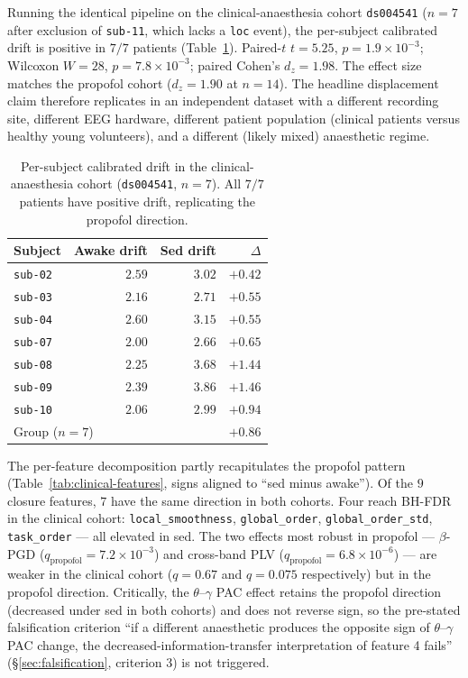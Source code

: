 \documentclass[11pt,a4paper]{article}
\begin{document}
Running the identical pipeline on the clinical-anaesthesia cohort \texttt{ds004541} ($n=7$ after exclusion of \texttt{sub-11}, which lacks a \texttt{loc} event), the per-subject calibrated drift is positive in $7/7$ patients (Table~\ref{tab:clinical-drift}). Paired-$t$ $t=5.25$, $p=1.9\!\times\!10^{-3}$; Wilcoxon $W=28$, $p=7.8\!\times\!10^{-3}$; paired Cohen's $d_z=1.98$. The effect size matches the propofol cohort ($d_z=1.90$ at $n=14$). The headline displacement claim therefore replicates in an independent dataset with a different recording site, different EEG hardware, different patient population (clinical patients versus healthy young volunteers), and a different (likely mixed) anaesthetic regime.

\begin{table}[h]
\centering\small
\caption{Per-subject calibrated drift in the clinical-anaesthesia cohort (\texttt{ds004541}, $n=7$). All $7/7$ patients have positive drift, replicating the propofol direction.}\label{tab:clinical-drift}
\begin{tabular}{lrrr}\toprule
Subject & Awake drift & Sed drift & $\Delta$ \\
\midrule
\texttt{sub-02} & $2.59$ & $3.02$ & $+0.42$ \\
\texttt{sub-03} & $2.16$ & $2.71$ & $+0.55$ \\
\texttt{sub-04} & $2.60$ & $3.15$ & $+0.55$ \\
\texttt{sub-07} & $2.00$ & $2.66$ & $+0.65$ \\
\texttt{sub-08} & $2.25$ & $3.68$ & $+1.44$ \\
\texttt{sub-09} & $2.39$ & $3.86$ & $+1.46$ \\
\texttt{sub-10} & $2.06$ & $2.99$ & $+0.94$ \\
\midrule
\multicolumn{2}{l}{Group ($n=7$)} & & $+0.86$ \\
\bottomrule\end{tabular}
\end{table}

The per-feature decomposition partly recapitulates the propofol pattern (Table~\ref{tab:clinical-features}, signs aligned to ``sed minus awake''). Of the $9$ closure features, $7$ have the same direction in both cohorts. Four reach BH-FDR in the clinical cohort: \texttt{local\_smoothness}, \texttt{global\_order}, \texttt{global\_order\_std}, \texttt{task\_order} --- all elevated in sed. The two effects most robust in propofol --- $\beta$-PGD ($q_{\text{propofol}}=7.2\!\times\!10^{-3}$) and cross-band PLV ($q_{\text{propofol}}=6.8\!\times\!10^{-6}$) --- are weaker in the clinical cohort ($q=0.67$ and $q=0.075$ respectively) but in the propofol direction. Critically, the $\theta$--$\gamma$ PAC effect retains the propofol direction (decreased under sed in both cohorts) and does not reverse sign, so the pre-stated falsification criterion ``if a different anaesthetic produces the opposite sign of $\theta$--$\gamma$ PAC change, the decreased-information-transfer interpretation of feature 4 fails'' (\S\ref{sec:falsification}, criterion 3) is not triggered.
\end{document}
